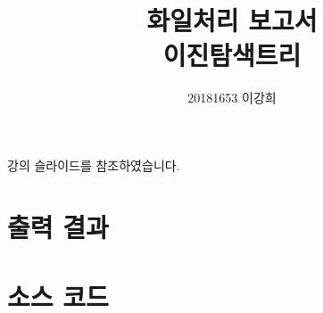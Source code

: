 \documentclass[10pt]{article}
\title{화일처리 보고서\\이진탐색트리}
\author{20181653 이강희}
\begin{document}
\maketitle

\begin{center}
강의 슬라이드를 참조하였습니다.
\end{center}

\newpage

\section{출력 결과}



\section{소스 코드}

\inputminted{cpp}{main.cpp}
\end{document}
